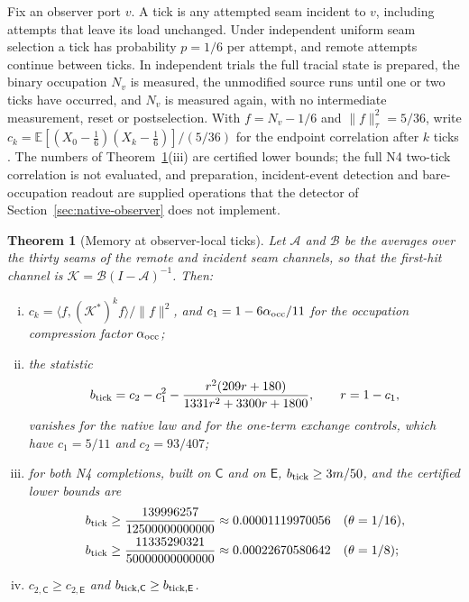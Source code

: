 \documentclass[11pt]{article}
\newtheorem{theorem}{Theorem}[section]
\theoremstyle{definition}
\theoremstyle{remark}
\theoremstyle{plain}
\newcommand{\Ex}{\mathbb{E}}
\newcommand{\Cn}{\mathsf{C}}
\newcommand{\En}{\mathsf{E}}
\begin{document}
Fix an observer port $v$. A tick is any attempted seam incident to $v$,
including attempts that leave its load unchanged. Under independent uniform
seam selection a tick has probability $p=1/6$ per attempt, and remote attempts
continue between ticks. In independent trials the full tracial state is
prepared, the binary occupation $N_v$ is measured, the unmodified source runs
until one or two ticks have occurred, and $N_v$ is measured again, with no
intermediate measurement, reset or postselection. With $f=N_v-1/6$ and
$\lVert f\rVert^2_\tau=5/36$, write
$c_k=\Ex[(X_0-\frac16)(X_k-\frac16)]/(5/36)$ for the endpoint correlation
after $k$ ticks \cite{ltREADME,ltSPEC}. The numbers of
Theorem~\ref{thm:tick}(iii) are certified lower bounds; the full N4 two-tick
correlation is not evaluated, and preparation, incident-event detection and
bare-occupation readout are supplied operations that the detector of
Section~\ref{sec:native-observer} does not implement.

\begin{theorem}[Memory at observer-local ticks]
\label{thm:tick}
Let $\mathcal A$ and $\mathcal B$ be the averages over the thirty seams of the
remote and incident seam channels, so that the first-hit channel is
$\mathcal K=\mathcal B(I-\mathcal A)^{-1}$. Then:
\begin{enumerate}[(i)]
\item $c_k=\langle f,(\mathcal K^*)^kf\rangle/\lVert f\rVert^2$, and
$c_1=1-6\alpha_{\rm occ}/11$ for the occupation compression factor
$\alpha_{\rm occ}$;
\item the statistic
\[
b_{\rm tick}=c_2-c_1^2-\frac{r^2(209r+180)}{1331r^2+3300r+1800},\qquad r=1-c_1,
\]
vanishes for the native law and for the one-term exchange controls, which
have $c_1=5/11$ and $c_2=93/407$;
\item for both N4 completions, built on $\Cn$ and on $\En$,
$b_{\rm tick}\ge3m/50$, and the certified lower bounds are
\[
\begin{aligned}
b_{\rm tick}&\ge\frac{139996257}{12500000000000}\approx0.00001119970056
&&(\theta=1/16),\\
b_{\rm tick}&\ge\frac{11335290321}{50000000000000}\approx0.00022670580642
&&(\theta=1/8);
\end{aligned}
\]
\item $c_{2,\Cn}\ge c_{2,\En}$ and $b_{{\rm tick},\Cn}\ge b_{{\rm tick},\En}$.
\end{enumerate}
\end{theorem}
\end{document}
